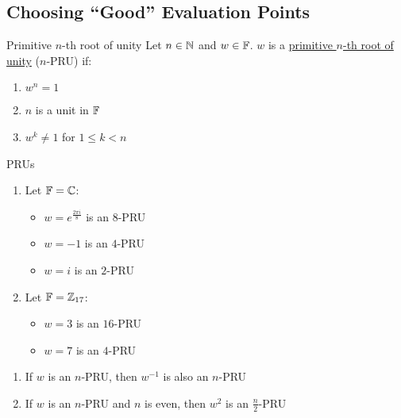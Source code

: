 \subsection{Choosing ``Good'' Evaluation Points}
\begin{definition}{Primitive $n$-th root of unity}{}
    Let $n \in \operatorname{\mathbb{N}}$ and $w \in \operatorname{\mathbb{F}}$. $w$ is a \underline{primitive $n$-th root of unity} ($n$-PRU) if:
    \begin{enumerate}
        \item $w^n = 1$
        \item $n$ is a unit in $\operatorname{\mathbb{F}}$
        \item $w^k \neq 1$ for $1 \leq k < n$
    \end{enumerate}
\end{definition}

\begin{example}{PRUs}{}
    \begin{enumerate}
        \item Let $\operatorname{\mathbb{F}} = \operatorname{\mathbb{C}}$:
        \begin{itemize}
            \item $w = e^{\frac{2\pi i}{8}}$ is an $8$-PRU
            \item $w = -1$ is an $4$-PRU
            \item $w = i$ is an $2$-PRU
        \end{itemize}

        \item Let $\operatorname{\mathbb{F}} = \operatorname{\mathbb{Z}}_{17}$:
        \begin{itemize}
            \item $w = 3$ is an $16$-PRU
            \item $w = 7$ is an $4$-PRU
        \end{itemize}
    \end{enumerate}
\end{example}

\begin{proposition}{}{}
    \begin{enumerate}
        \item If $w$ is an $n$-PRU, then $w^{-1}$ is also an $n$-PRU
        \item If $w$ is an $n$-PRU and $n$ is even, then $w^2$ is an $\frac{n}{2}$-PRU
    \end{enumerate}
\end{proposition}

